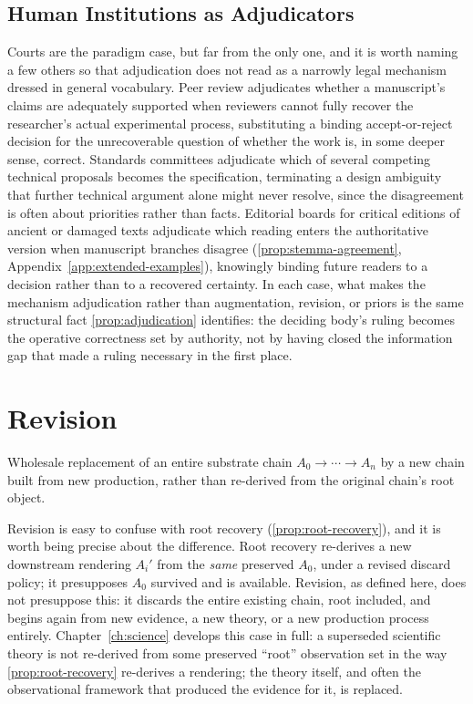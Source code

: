 \subsection{Human Institutions as Adjudicators}

Courts are the paradigm case, but far from the only one, and it is worth
naming a few others so that adjudication does not read as a narrowly
legal mechanism dressed in general vocabulary. Peer review adjudicates
whether a manuscript's claims are adequately supported when reviewers
cannot fully recover the researcher's actual experimental process,
substituting a binding accept-or-reject decision for the unrecoverable
question of whether the work is, in some deeper sense, correct.
Standards committees adjudicate which of several competing technical
proposals becomes the specification, terminating a design ambiguity that
further technical argument alone might never resolve, since the
disagreement is often about priorities rather than facts. Editorial
boards for critical editions of ancient or damaged texts adjudicate
which reading enters the authoritative version when manuscript branches
disagree (\cref{prop:stemma-agreement}, Appendix~\ref{app:extended-examples}),
knowingly binding future readers to a decision rather than to a
recovered certainty. In each case, what makes the mechanism adjudication
rather than augmentation, revision, or priors is the same structural
fact \cref{prop:adjudication} identifies: the deciding body's ruling
becomes the operative correctness set by authority, not by having closed
the information gap that made a ruling necessary in the first place.

\section{Revision}
\label{sec:coord-revision}

\begin{definition}
\label{def:relay-revision}
Wholesale replacement of an entire substrate chain $A_0 \to \cdots \to
A_n$ by a new chain built from new production, rather than re-derived
from the original chain's root object.
\end{definition}

Revision is easy to confuse with root recovery (\cref{prop:root-recovery}),
and it is worth being precise about the difference. Root recovery
re-derives a new downstream rendering $A_i'$ from the \emph{same}
preserved $A_0$, under a revised discard policy; it presupposes $A_0$
survived and is available. Revision, as defined here, does not presuppose
this: it discards the entire existing chain, root included, and begins
again from new evidence, a new theory, or a new production process
entirely. Chapter~\ref{ch:science} develops this case in full: a
superseded scientific theory is not re-derived from some preserved
``root'' observation set in the way \cref{prop:root-recovery} re-derives
a rendering; the theory itself, and often the observational framework
that produced the evidence for it, is replaced.

